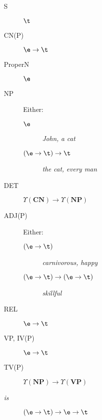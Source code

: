 	\begin{minipage}{.7\textwidth}
		\begin{multicols}{2}
			\begin{description}
				\item[S] $\t$
				\item[CN(P)] $\e\to \t$
				\item[ProperN] $\e$
				\item[NP] Either:
				      \begin{description}
					      \item[$\e$] \textsl{John, a cat}
					      \item[$\left(\e\to\t\right) \to \t$] \textsl{the cat, every man}
				      \end{description}
				\item[DET] $\Upsilon\left( \mathbf{CN} \right) \to \Upsilon\left( \mathbf{NP} \right)$
				\item[ADJ(P)] Either:
				      \begin{description}
					      \item[$\left( \e \to \t \right)$] \textsl{carnivorous, happy}
					      \item[$\left( \e \to \t \right) \to \left( \e \to \t \right)$] \textsl{skillful}
				      \end{description}
				\item[REL] $\e \to \t$
				\item[VP, IV(P)] $\e \to \t$
				\item[TV(P)] $\Upsilon\left( \mathbf{NP} \right) \to \Upsilon\left( \mathbf{VP }\right)$
				\item[\it is] $\left( \e \to \t \right) \to \e \to \t$
			\end{description}
		\end{multicols}
	\end{minipage}
